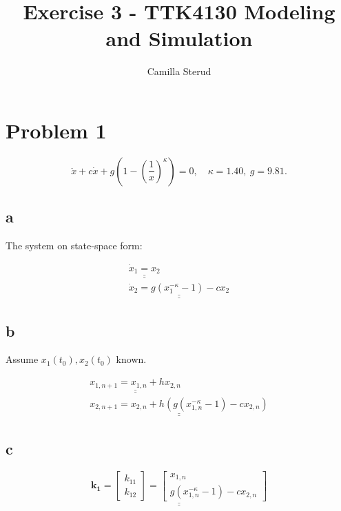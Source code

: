 \documentclass{article}
\title{Exercise 3 - TTK4130 Modeling and Simulation}
\author{Camilla Sterud}
\date{}
\begin{document}
\maketitle

\newpage

\section{Problem 1}

\begin{equation*}
    \ddot x + c\dot x + g(1-(\frac{1}{x})^{\kappa}) = 0, \quad \kappa = 1.40, \: g = 9.81.
\end{equation*}



\subsection{a}
The system on state-space form:

\begin{align*}
    \underline{\underline{\dot x_1 = x_2}}\\
    \underline{\underline{\dot x_2 = g(x_1^{-\kappa} - 1) - cx_2}}
\end{align*}

\subsection{b}

Assume $x_1(t_0), x_2(t_0)$ known.

\begin{align*}
    \underline{\underline{x_{1, n+1} = x_{1,n} + h x_{2,n}}}\\
    \underline{\underline{x_{2, n+1} = x_{2,n} + h(g(x_{1,n}^{-\kappa} - 1) - cx_{2,n})}}
\end{align*}

\subsection{c}

\begin{equation*}
    \underline{\underline{\mathbf{k_1} = \begin{bmatrix}
    k_{11}\\
    k_{12}
    \end{bmatrix} = \begin{bmatrix}
        x_{1,n} \\
        g(x_{1,n}^{-\kappa} - 1) - cx_{2,n}
    \end{bmatrix}}}
\end{equation*}
\end{document}
